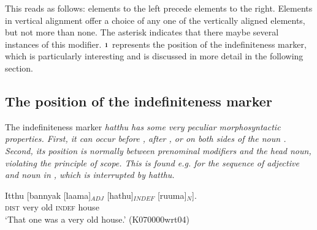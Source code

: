 \footnotesize
{}
\normalsize

This reads as follows: elements to the left precede elements to the right. Elements in vertical alignment offer a choice of any one of the vertically aligned elements, but not more than none.  The asterisk indicates that there maybe several instances of this modifier. $\oldstylenums{1}$ represents the position of the indefiniteness marker, which is particularly interesting and is discussed in more detail in the following section.

\subsection{The position of the indefiniteness marker}\label{sec:hatthu}
The indefiniteness marker \em hatthu \em has some very peculiar morphosyntactic properties. First, it can occur before , after , or on both sides of the noun . Second, its position is normally between prenominal modifiers and the head noun, violating the principle of scope. This is found e.g. for the sequence of adjective and noun in , which is interrupted by \em hatthu\em.

\ea\label{ex:positionhatthu:adjhatthun}
\gll Itthu [bannyak [laama]$_{ADJ}$ [hathu]$_{INDEF}$ [ruuma]$_{N}$]. \\ %
      \textsc{dist} very old \textsc{indef} house \\
    `That one was a very old house.'  (K070000wrt04)
\z
 

